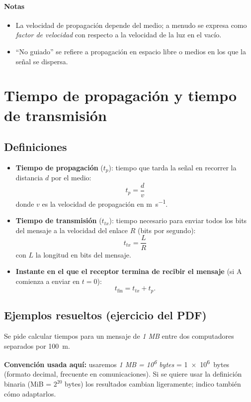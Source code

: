 \documentclass[11pt,a4paper]{article}
\begin{document}
\paragraph{Notas}
\begin{itemize}
  \item La velocidad de propagación depende del medio; a menudo se expresa como \emph{factor de velocidad} con respecto a la velocidad de la luz en el vacío.
  \item ``No guiado'' se refiere a propagación en espacio libre o medios en los que la señal se dispersa. 
\end{itemize}

\section{Tiempo de propagación y tiempo de transmisión}
\subsection{Definiciones}
\begin{itemize}
  \item \textbf{Tiempo de propagación} ($t_p$): tiempo que tarda la señal en recorrer la distancia $d$ por el medio:
  \[
    t_p = \frac{d}{v}
  \]
  donde $v$ es la velocidad de propagación en \si{\meter\per\second}.
  \item \textbf{Tiempo de transmisión} ($t_{tx}$): tiempo necesario para enviar todos los bits del mensaje a la velocidad del enlace $R$ (bits por segundo):
  \[
    t_{tx} = \frac{L}{R}
  \]
  con $L$ la longitud en bits del mensaje.
  \item \textbf{Instante en el que el receptor termina de recibir el mensaje} (si A comienza a enviar en $t=0$): 
  \[
    t_\text{fin} = t_{tx} + t_p.
  \]
\end{itemize}

\subsection{Ejemplos resueltos (ejercicio del PDF)}
Se pide calcular tiempos para un mensaje de \emph{1 MB} entre dos computadores separados por \SI{100}{\meter}.

\medskip
\textbf{Convención usada aquí:} usaremos \emph{1 MB = 10\textsuperscript{6} bytes} = \SI{1e6}{bytes} (formato decimal, frecuente en comunicaciones). Si se quiere usar la definición binaria (MiB = $2^{20}$ bytes) los resultados cambian ligeramente; indico también cómo adaptarlos.
\end{document}
